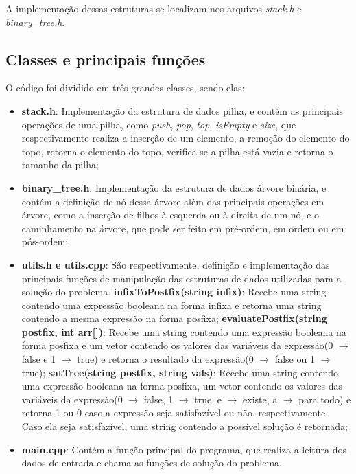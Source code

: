 \documentclass{article}
\begin{document}
A implementação dessas estruturas se localizam nos arquivos \textit{stack.h} e \textit{binary\_tree.h}.

\subsection{Classes e principais funções}
O código foi dividido em três grandes classes, sendo elas:
\begin{itemize}
    \item \textbf{stack.h}: Implementação da estrutura de dados pilha, e contém as principais operações de uma pilha, como \textit{push}, \textit{pop}, \textit{top}, \textit{isEmpty} e \textit{size}, que respectivamente realiza a inserção de um elemento, a remoção do elemento do topo, retorna o elemento do topo, verifica se a pilha está vazia e retorna o tamanho da pilha; 
    \item \textbf{binary\_tree.h}: Implementação da estrutura de dados árvore binária, e contém a definição de nó dessa árvore além das principais operações em árvore, como a inserção de filhos à esquerda ou à direita de um nó, e o caminhamento na árvore, que pode ser feito em pré-ordem, em ordem ou em pós-ordem;
    \item \textbf{utils.h e utils.cpp}: São respectivamente, definição e implementação das principais funções de manipulação das estruturas de dados utilizadas para a solução do problema.
        \subitem \textbf{infixToPostfix(string infix)}: Recebe uma string contendo uma expressão booleana na forma infixa e retorna uma string contendo a mesma expressão na forma posfixa;
        \subitem \textbf{evaluatePostfix(string postfix, int arr[])}: Recebe uma string contendo uma expressão booleana na forma posfixa e um vetor contendo os valores das variáveis da expressão(0 $\to$ false e 1 $\to$ true) e retorna o resultado da expressão(0 $\to$ false ou 1 $\to$ true);
        \subitem \textbf{satTree(string postfix, string vals)}: Recebe uma string contendo uma expressão booleana na forma posfixa, um vetor contendo os valores das variáveis da expressão(0 $\to$ false, 1 $\to$ true, e $\to$ existe, a $\to$ para todo) e retorna 1 ou 0 caso a expressão seja satisfazível ou não, respectivamente. Caso ela seja satisfazível, uma string contendo a possível solução é retornada;
    \item \textbf{main.cpp}: Contém a função principal do programa, que realiza a leitura dos dados de entrada e chama as funções de solução do problema.   
\end{itemize}
\end{document}
